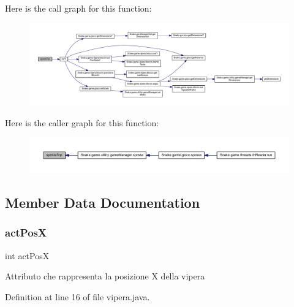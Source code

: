 Here is the call graph for this function\+:
\nopagebreak
\begin{figure}[H]
\begin{center}
\leavevmode
\includegraphics[width=350pt]{class_snake_1_1game_1_1vipera_1_1vipera_a43993392ddd2cba04e0df6312742f235_cgraph}
\end{center}
\end{figure}
Here is the caller graph for this function\+:
\nopagebreak
\begin{figure}[H]
\begin{center}
\leavevmode
\includegraphics[width=350pt]{class_snake_1_1game_1_1vipera_1_1vipera_a43993392ddd2cba04e0df6312742f235_icgraph}
\end{center}
\end{figure}


\subsection{Member Data Documentation}
\mbox{\label{class_snake_1_1game_1_1vipera_1_1vipera_aaa64105e6cedf2b98a63e3ab8c8f4cdb}} 
\subsubsection{\texorpdfstring{act\+PosX}{actPosX}}
{\footnotesize\ttfamily int act\+PosX\hspace{0.3cm}{\ttfamily [private]}}

Attributo che rappresenta la posizione X della vipera 

Definition at line 16 of file vipera.\+java.

